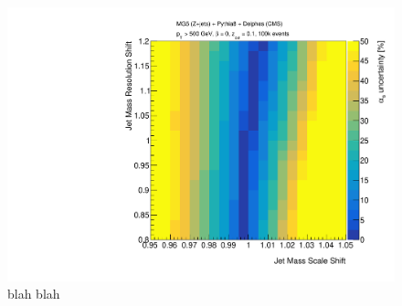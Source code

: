 \begin{figure}
\begin{center}
\includegraphics[width = 0.49\columnwidth]{figures/experimentaldemo/resolution_scan.pdf}
\end{center}
\caption{blah blah}
\label{fig:expfit}
\end{figure}

